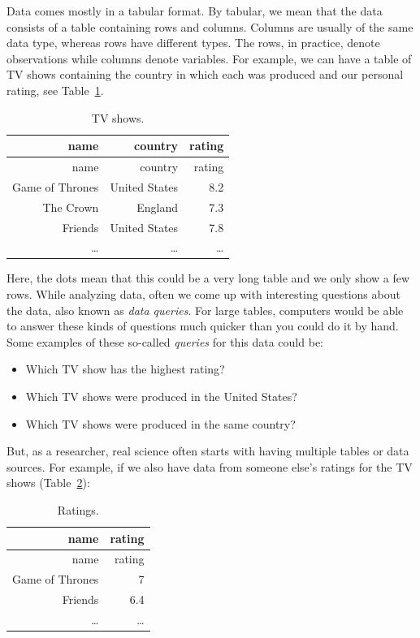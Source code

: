 \documentclass[
  notoc %
]{tufte-book}
\providecommand{\tightlist}{%
  \setlength{\itemsep}{0pt}\setlength{\parskip}{0pt}
}
\begin{document}
Data comes mostly in a tabular format. By tabular, we mean that the data
consists of a table containing rows and columns. Columns are usually of
the same data type, whereas rows have different types. The rows, in
practice, denote observations while columns denote variables. For
example, we can have a table of TV shows containing the country in which
each was produced and our personal rating, see Table~\ref{tbl:TV_shows}.

\hypertarget{tbl:TV_shows}{}
\begin{longtable}[]{@{}rrr@{}}
\caption{\label{tbl:TV_shows}TV shows.}\tabularnewline
\toprule
name & country & rating \\
\midrule
\endfirsthead
\toprule
name & country & rating \\
\midrule
\endhead
Game of Thrones & United States & 8.2 \\
The Crown & England & 7.3 \\
Friends & United States & 7.8 \\
\ldots{} & \ldots{} & \ldots{} \\
\bottomrule
\end{longtable}

Here, the dots mean that this could be a very long table and we only
show a few rows. While analyzing data, often we come up with interesting
questions about the data, also known as \emph{data queries}. For large
tables, computers would be able to answer these kinds of questions much
quicker than you could do it by hand. Some examples of these so-called
\emph{queries} for this data could be:

\begin{itemize}
\tightlist
\item
  Which TV show has the highest rating?
\item
  Which TV shows were produced in the United States?
\item
  Which TV shows were produced in the same country?
\end{itemize}

But, as a researcher, real science often starts with having multiple
tables or data sources. For example, if we also have data from someone
else's ratings for the TV shows (Table~\ref{tbl:ratings}):

\hypertarget{tbl:ratings}{}
\begin{longtable}[]{@{}rr@{}}
\caption{\label{tbl:ratings}Ratings.}\tabularnewline
\toprule
name & rating \\
\midrule
\endfirsthead
\toprule
name & rating \\
\midrule
\endhead
Game of Thrones & 7 \\
Friends & 6.4 \\
\ldots{} & \ldots{} \\
\bottomrule
\end{longtable}
\end{document}
